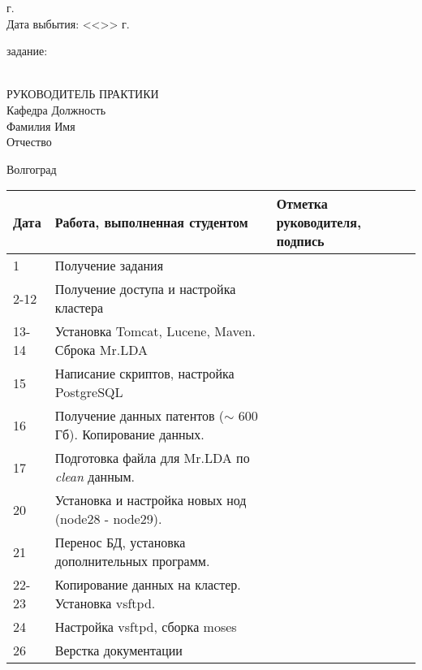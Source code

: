 \begin{titlepage}
\begin{flushleft}
        \the\year г.\\
        Дата выбытия: \hspace{3cm}<<\underline{\hspace{1cm}}>> \underline{\hspace{3cm}} 
        \the\year г.
    \end{flushleft}
    \vspace{0.5cm}
     задание: \underline{\hspace{11.25cm}}\\
    \underline{\hspace{\textwidth}}\\
    \vspace{0.5cm}
    \begin{flushleft}
        РУКОВОДИТЕЛЬ ПРАКТИКИ\\
        Кафедра \underline{\hspace{5.15cm}} Должность \underline{\hspace{5cm}} \\
        Фамилия \underline{\hspace{5cm}} Имя \underline{\hspace{6.5cm}}\\
        Отчество \underline{\hspace{5cm}}
    \end{flushleft}
    \vspace{\fill}
    \begin{center}
        Волгоград \the\year
    \end{center}
\end{titlepage}
\begin{table}[h!]
    \centering
    \begin{tabular}{|m{}|m{}|m{}|}
        \hline
        Дата & Работа, выполненная студентом & Отметка
        руководителя, подпись \\ \hline
        1 & Получение задания & \\ \hline
        2-12 & Получение доступа и настройка кластера & \\ \hline
        13-14 & Установка Tomcat, Lucene, Maven. Сброка Mr.LDA & \\ \hline
        15 & Написание скриптов, настройка PostgreSQL & \\ \hline
        16 & Получение данных патентов (\( \sim \) 600 Гб). Копирование данных. & \\ \hline
        17 & Подготовка файла для Mr.LDA по \emph{clean} данным. & \\ \hline
        20 & Установка и настройка новых нод (node28 - node29). & \\ \hline
        21 & Перенос БД, установка дополнительных программ. & \\ \hline
        22-23 & Копирование данных на кластер. Установка vsftpd. & \\ \hline
        24 & Настройка vsftpd, сборка moses & \\ \hline
        26 & Верстка документации & \\ \hline
    \end{tabular}
\end{table}
